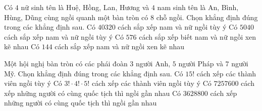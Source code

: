 

\begin{ex}%
	 Có $4$ nữ sinh tên là Huệ, Hồng, Lan, Hương và $4$ nam sinh tên là An, Bình, Hùng, Dũng cùng ngồi quanh một bàn tròn có $8$ chỗ ngồi. Chọn khẳng định đúng trong các khẳng định sau.
	 \choiceTF
		{Có $40320$ cách sắp xếp nam và nữ ngồi  tùy ý}
		{\True Có $5040$ cách sắp xếp nam và nữ ngồi tùy ý} 
		{Có $576$  cách sắp xếp biết nam và nữ ngồi xen kẽ nhau}
		{\True  Có $144$ cách sắp xếp nam và nữ ngồi xen kẽ nhau}
\end{ex}

\begin{ex}%
	Một hội nghị bàn tròn có các phái đoàn $3$ người  Anh, $5$ người Pháp và $7$ người Mỹ. Chọn khẳng định đúng trong các khẳng định sau.
	 \choiceTF
		 {\True Có $15!$ cách xếp các thành viên ngồi tùy ý}
		{Có $3!\cdot 4!\cdot 5!$ cách xếp các  thành viên ngồi tùy ý}
		{\True Có $7257600$ cách  xếp những người có cùng quốc tịch thì ngồi gần nhau}
		{Có $3628800$ cách xếp những người có cùng quốc  tịch thì ngồi gần nhau}
\end{ex}


